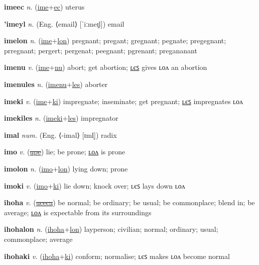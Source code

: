 \textbf{\hypertarget{imeec}{imeec}} \textit{n.} (\hyperlink{ime}{ime}+\allowbreak \hyperlink{ec}{ec})
uterus

\textbf{\hypertarget{'imeyl}{'imeyl}} \textit{n.} (Eng. ⟨email⟩ [ˈiːmeɪ̯l])
email

\textbf{\hypertarget{imelon}{imelon}} \textit{n.} (\hyperlink{ime}{ime}+\allowbreak \hyperlink{lon}{lon})
pregnant; pregant; gregnant; pegnate; pregegnant; prregnant; pergert; pergenat; peegnant; pgrenant; pregananant

\textbf{\hypertarget{imenu}{imenu}} \textit{v.} (\hyperlink{ime}{ime}+\allowbreak \hyperlink{nu}{nu})
abort; get abortion; \hyperlink{imenules}{ʟєꜱ} gives ʟᴏᴧ an abortion

\textbf{\hypertarget{imenules}{imenules}} \textit{n.} (\hyperlink{imenu}{imenu}+\allowbreak \hyperlink{les}{les})
aborter

\textbf{\hypertarget{imeki}{imeki}} \textit{v.} (\hyperlink{ime}{ime}+\allowbreak \hyperlink{ki}{ki})
impregnate; inseminate; get pregnant; \hyperlink{imekiles}{ʟєꜱ} impregnates ʟᴏᴧ

\textbf{\hypertarget{imekiles}{imekiles}} \textit{n.} (\hyperlink{imeki}{imeki}+\allowbreak \hyperlink{les}{les})
impregnator

\textbf{\hypertarget{imal}{imal}} \textit{num.} (Eng. ⟨-imal⟩ [ɪml̩])
radix

\textbf{\hypertarget{imo}{imo}} \textit{v.} (\hyperlink{upe}{\sout{upe}})
lie; be prone; \hyperlink{imolon}{ʟᴏᴧ} is prone

\textbf{\hypertarget{imolon}{imolon}} \textit{n.} (\hyperlink{imo}{imo}+\allowbreak \hyperlink{lon}{lon})
lying down; prone

\textbf{\hypertarget{imoki}{imoki}} \textit{v.} (\hyperlink{imo}{imo}+\allowbreak \hyperlink{ki}{ki})
lie down; knock over; ʟєꜱ lays down ʟᴏᴧ

\textbf{\hypertarget{ihoha}{ihoha}} \textit{v.} (\hyperlink{uceca}{\sout{uceca}})
be normal; be ordinary; be usual; be commonplace; blend in; be average; \hyperlink{ihohalon}{ʟᴏᴧ} is expectable from its surroundings

\textbf{\hypertarget{ihohalon}{ihohalon}} \textit{n.} (\hyperlink{ihoha}{ihoha}+\allowbreak \hyperlink{lon}{lon})
layperson; civilian; normal; ordinary; usual; commonplace; average

\textbf{\hypertarget{ihohaki}{ihohaki}} \textit{v.} (\hyperlink{ihoha}{ihoha}+\allowbreak \hyperlink{ki}{ki})
conform; normalise; ʟєꜱ makes ʟᴏᴧ become normal

